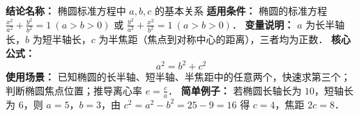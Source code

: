 \textbf{结论名称：} 椭圆标准方程中 $a,b,c$ 的基本关系  
\textbf{适用条件：} 椭圆的标准方程 $\frac{x^{2}}{a^{2}}+\frac{y^{2}}{b^{2}}=1\ (a>b>0)$ 或 $\frac{y^{2}}{a^{2}}+\frac{x^{2}}{b^{2}}=1\ (a>b>0)$．  
\textbf{变量说明：} $a$ 为长半轴长，$b$ 为短半轴长，$c$ 为半焦距（焦点到对称中心的距离），三者均为正数．  
\textbf{核心公式：}  
\[
\boxed{a^{2}=b^{2}+c^{2}}
\]  
\textbf{使用场景：} 已知椭圆的长半轴、短半轴、半焦距中的任意两个，快速求第三个；判断椭圆焦点位置；推导离心率 $e=\frac{c}{a}$．  
\textbf{简单例子：} 若椭圆长轴长为 $10$，短轴长为 $6$，则 $a=5$，$b=3$，由 $c^{2}=a^{2}-b^{2}=25-9=16$ 得 $c=4$，焦距 $2c=8$．